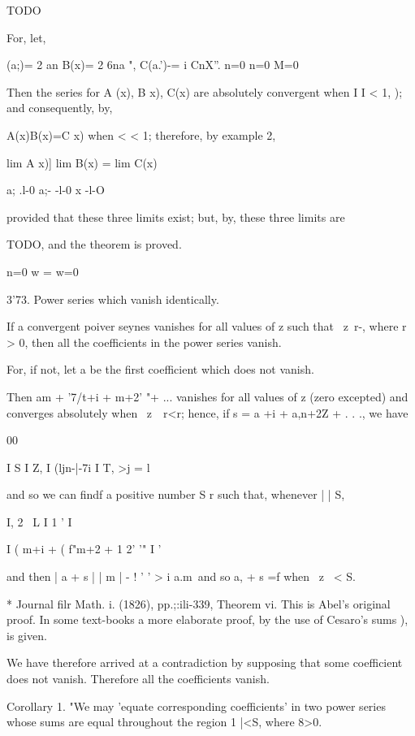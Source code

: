 TODO

For, let,

 (a;)= 2 an B(x)= 2 6na ", C(a.')-= i CnX''. n=0 n=0 M=0

Then the series for A (x), B x), C(x) are absolutely convergent when I
I < 1, ); and consequently, by,

A(x)B(x)=C x) when < < 1; therefore, by example 2,

  lim A x)] lim B(x) = lim C(x)\

a; .l-0 a;- -l-0 x -l-O

provided that these three limits exist; but, by, these three
limits are

TODO, and the theorem is proved.

n=0 w = w=0

3'73. Power series which vanish identically.

If a convergent poiver seynes vanishes for all values of z such that \
z\ r-, where r > 0, then all the coefficients in the power series
vanish.

For, if not, let a be the first coefficient which does not vanish.

Then am + '7/t+i + m+2' "+ ... vanishes for all values of z (zero
excepted) and converges absolutely when \ z\ \ r<r; hence, if s = a
+i + a,n+2Z + . . ., we have

00

I S I Z, I (ljn-|-7i I T, >j = l

and so we can findf a positive number S r such that, whenever | | S,

I, 2 \ L I 1 ' I

I ( m+i + ( f"m+2 +    1 2' '" I '

and then | a + s | | m | - ! ' ' > i a.m\, and so a, + s =f when \ z
\ < S.

* Journal filr Math. i. (1826), pp.;:ili-339, Theorem vi. This is
Abel's original proof. In some text-books a more elaborate proof, by
the use of Cesaro's sums \hardsubsectionref{8}{4}{3}), is given.

%
%

We have therefore arrived at a contradiction by supposing that some
coefficient does not vanish. Therefore all the coefficients vanish.

Corollary 1. "We may 'equate corresponding coefficients' in two power
series whose sums are equal throughout the region 1 |<S, where 8>0.

